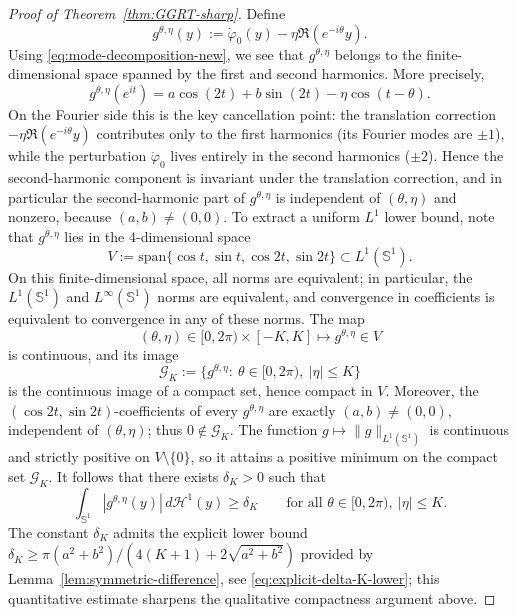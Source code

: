 \documentclass[a4paper,11pt,reqno]{amsart}
\numberwithin{equation}{section}
\theoremstyle{plain} %
\theoremstyle{definition} %
\theoremstyle{remark}
\begin{document}
\begin{proof}[Proof of Theorem~\ref{thm:GGRT-sharp}]
Define
\[
g^{\theta,\eta}(y)
:=
\dot\varphi_0(y)-\eta \Re(e^{-i\theta}y).
\]
Using \eqref{eq:mode-decomposition-new}, we see that $g^{\theta,\eta}$ belongs
to the finite-dimensional space spanned by the first and second harmonics.
More precisely,
\[
g^{\theta,\eta}(e^{it})
=
a\cos(2t)+b\sin(2t)-\eta \cos(t-\theta).
\]
On the Fourier side this is the key cancellation point: the translation
correction $-\eta\Re(e^{-i\theta}y)$ contributes only to the first harmonics
(its Fourier modes are $\pm 1$), while the perturbation
$\dot\varphi_0$ lives entirely in the second harmonics ($\pm 2$). Hence the
second-harmonic component is invariant under the translation correction, and
in particular the second-harmonic part of $g^{\theta,\eta}$ is independent of
$(\theta,\eta)$ and nonzero, because $(a,b)\neq (0,0)$. To extract a uniform \(L^1\) lower bound, note that
\(g^{\theta,\eta}\) lies in the \(4\)-dimensional space
\[
V:=\mathrm{span}\bigl\{\cos t,\sin t,\cos 2t,\sin 2t\bigr\}\subset L^1(\mathbb S^1).
\]
On this finite-dimensional space, all norms are equivalent; in particular, the
\(L^1(\mathbb S^1)\) and \(L^\infty(\mathbb S^1)\) norms are equivalent, and
convergence in coefficients is equivalent to convergence in any of these norms. The map
\[
(\theta,\eta)\in [0,2\pi)\times [-K,K]\longmapsto g^{\theta,\eta}\in V
\]
is continuous, and its image
\[
\mathcal G_K:=\{g^{\theta,\eta}:\ \theta\in[0,2\pi),\ |\eta|\leq K\}
\]
is the continuous image of a compact set, hence compact in \(V\). Moreover, the
\((\cos 2t,\sin 2t)\)-coefficients of every \(g^{\theta,\eta}\) are exactly
\((a,b)\neq (0,0)\), independent of \((\theta,\eta)\); thus \(0\notin
\mathcal G_K\). The function \(g\mapsto\|g\|_{L^1(\mathbb S^1)}\) is continuous
and strictly positive on \(V\setminus\{0\}\), so it attains a positive minimum
on the compact set \(\mathcal G_K\). It follows that there exists
$\delta_K>0$ such that
\begin{equation}\label{eq:uniform-l1-lower-new}
\int_{\mathbb S^1}|g^{\theta,\eta}(y)|\,d\mathcal H^1(y)\geq \delta_K
\qquad
\text{for all }\theta\in[0,2\pi),\ |\eta|\leq K.
\end{equation}
The constant \(\delta_K\) admits the explicit lower bound
\(\delta_K\ge \pi(a^2+b^2)/(4(K+1)+2\sqrt{a^2+b^2})\) provided by
Lemma~\ref{lem:symmetric-difference}, see \eqref{eq:explicit-delta-K-lower};
this quantitative estimate sharpens the qualitative compactness argument
above.


\end{proof}
\end{document}
